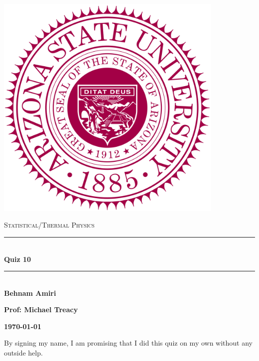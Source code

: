 \documentclass[fleqn]{article}
\begin{document}
  \begin{titlepage}

    \newcommand{\HRule}{\rule{\linewidth}{0.5mm}}

    \center

    \begin{center}
      \includegraphics[height=11cm, width=11cm]{asu.png}
    \end{center}

    \vline

    \textsc{\LARGE Statistical/Thermal Physics}\\[1.5cm]

    \HRule \\[0.5cm]
    { \huge \bfseries Quiz 10}\\[0.4cm] 
    \HRule \\[1.0cm]

    \textbf{Behnam Amiri}

    \bigbreak

    \textbf{Prof: Michael Treacy}

    \bigbreak

    \textbf{{\large \today}\\[2cm]}

    \vfill

  \end{titlepage}

  By signing my name, I am promising that I did this quiz on my own without any outside help.

  \vspace{0.5cm}
\end{document}
